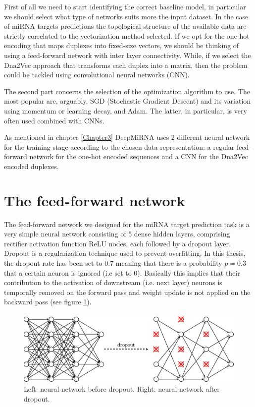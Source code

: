First of all we need to start identifying the correct baseline model, in particular we should select what type of networks suits more the input dataset. In the case of miRNA targets predictions the topological structure of the available data are strictly correlated to the vectorization method selected. If we opt for the one-hot encoding that maps duplexes into fixed-size vectors, we should be thinking of using a feed-forward network with inter layer connectivity. While, if we select the Dna2Vec approach that transforms each duplex into a matrix, then the problem could be tackled using convolutional neural networks (CNN)\cite{dl}.  

The second part concerns the selection of the optimization algorithm to use. The most popular are, arguably, SGD (Stochastic Gradient Descent) and its variation using momentum or learning decay, and Adam. The latter, in particular, is very often used combined with CNNs.

As mentioned in chapter \ref{Chapter3} DeepMiRNA uses 2 different neural network for the training stage according to the chosen data representation: a regular feed-forward network for the one-hot encoded sequences and a CNN for the Dna2Vec encoded duplexes. 

\section{The feed-forward network} 
The feed-forward network we designed for the miRNA target prediction task is a very simple neural network consisting of 5 dense hidden layers, comprising rectifier activation function ReLU nodes, each followed by a dropout layer. Dropout \cite{dropout} is a regularization technique used to prevent overfitting. In this thesis, the dropout rate has been set to $0.7$ meaning that there is a probability $p = 0.3$ that a certain neuron is ignored (i.e set to 0). Basically this implies that their contribution to the activation of downstream (i.e. next layer) neurons  is temporally removed on the forward pass and weight update is not applied on the backward pass (see figure \ref{fig:dropout}).

\begin{figure}[hbt!]
	\centering
	\includegraphics[width=\textwidth, height=0.3\textheight]{Figures/dropout}
	\caption{Left: neural network before dropout. Right: neural network after dropout.}
	\label{fig:dropout}
\end{figure}   

